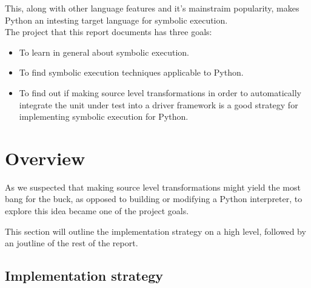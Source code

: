 \documentclass[11pt]{report}
\begin{document}
This, along with other language features and it's mainstraim
popularity, makes Python an intesting target language for symbolic
execution. \\

The project that this report documents has three goals:
\begin{itemize}
  \item To learn in general about symbolic execution.
  \item To find symbolic execution techniques applicable to Python.
  \item To find out if making source level transformations in order to
    automatically integrate the unit under test into a driver
    framework is a good strategy for implementing symbolic execution
    for Python.
\end{itemize}


\section{Overview}

As we suspected that making source level transformations might yield
the most bang for the buck, as opposed to building or modifying a
Python interpreter, to explore this idea became one of the project
goals.

This section will outline the implementation strategy on a high level,
followed by an joutline of the rest of the report.

\subsection{Implementation strategy}
\end{document}
